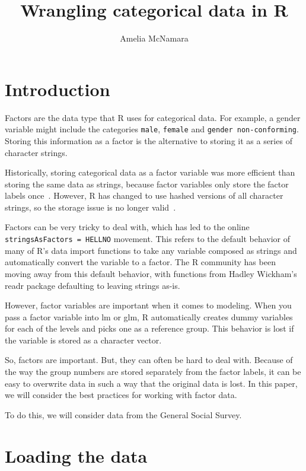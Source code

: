 \documentclass[fleqn,10pt,lineno]{wlpeerj}\usepackage[]{graphicx}\usepackage[]{color}
\title{Wrangling categorical data in R}
\author[1]{Amelia McNamara}
\affil[1]{Smith College}
\let\proglang=\textsf
\newcommand{\pkg}[1]{{\fontseries{b}\selectfont #1}}
\begin{document}
\flushbottom
\maketitle
\thispagestyle{empty}

\section*{Introduction}



Factors are the data type that R uses for categorical data. For example, a gender variable might include the categories \verb#male#, \verb#female# and \verb#gender non-conforming#. Storing this information as a factor is the alternative to storing it as a series of character strings. 

Historically, storing categorical data as a factor variable was more efficient than storing the same data as strings, because factor variables only store the factor labels once~\citep{Pen2015}. However, R has changed to use hashed versions of all character strings, so the storage issue is no longer valid~\citep{Pen2015}. 

Factors can be very tricky to deal with, which has led to the online \verb#stringsAsFactors = HELLNO# movement. This refers to the default behavior of many of R's data import functions to take any variable composed as strings and automatically convert the variable to a factor. The R community has been moving away from this default behavior, with functions from Hadley Wickham's \pkg{readr} package defaulting to leaving strings as-is. 

However, factor variables are important when it comes to modeling. When you pass a factor variable into \pkg{lm} or \pkg{glm}, \proglang{R} automatically creates dummy variables for each of the levels and picks one as a reference group. This behavior is lost if the variable is stored as a character vector.  

So, factors are important. But, they can often be hard to deal with. Because of the way the group numbers are stored separately from the factor labels, it can be easy to overwrite data in such a way that the original data is lost. In this paper, we will consider the best practices for working with factor data. 

To do this, we will consider data from the General Social Survey. 


\section*{Loading the data}
\end{document}
